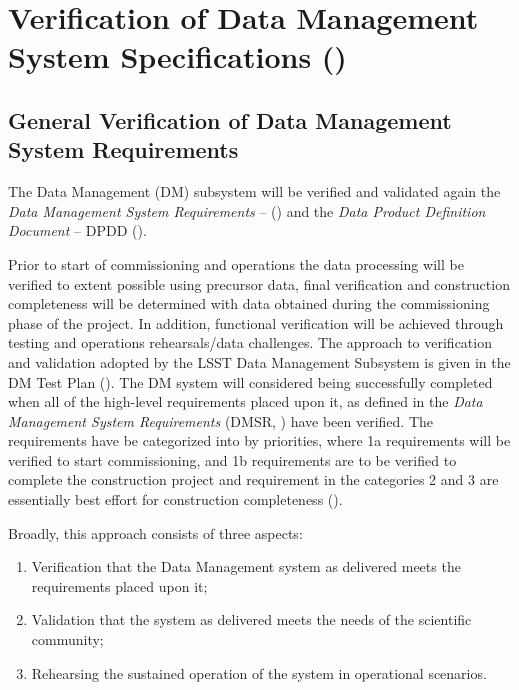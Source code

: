 \section{Verification of Data Management  System Specifications ()}  \label{sec:dm}

\subsection{General Verification of Data Management System Requirements   }

The Data Management (DM) subsystem will be verified and validated again the {\it Data Management System Requirements} -- () and the  {\it Data Product Definition Document} -- DPDD ().

Prior to start of commissioning and operations the data processing will be verified to extent possible using precursor data, final verification and construction completeness will be determined with data obtained during the commissioning phase of the project.  In addition, functional verification will be achieved through testing and operations rehearsals/data challenges.  The approach to verification and validation adopted by the LSST Data Management Subsystem is given in the DM Test Plan ().   The DM system will considered being successfully completed when all of the high-level requirements placed upon it, as defined in the {\it Data Management System Requirements} (DMSR,  ) have been verified.  The requirements have be categorized into by priorities, where 1a requirements will be verified to start commissioning, and 1b requirements are to be verified to complete the construction project and requirement in the categories 2 and 3 are essentially best effort for construction completeness ().

Broadly, this approach consists of three aspects:

\begin{enumerate}
	\item Verification that the Data Management system as delivered meets the requirements placed upon it;
	\item Validation that the system as delivered meets the needs of the scientific community;
	\item Rehearsing the sustained operation of the system in operational scenarios.
\end{enumerate}

